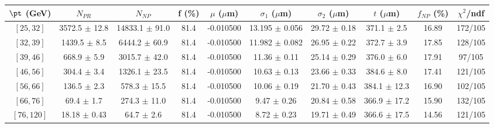 \begin{tabular}{c||c|c|c|c|c|c|c||c|c}
$\pt$ (GeV) & $N_{PR}$ & $N_{NP}$ & f (\%) & $\mu$ ($\mu$m) & $\sigma_1$ ($\mu$m) & $\sigma_2$ ($\mu$m)  & $t$ ($\mu$m) & $f_{NP}$ (\%) & $\chi^2$/ndf \\
\hline
$[25, 32]$ & 3572.5 $\pm$ 12.8 & 14833.1 $\pm$ 91.0 & 81.4 & -0.010500 & 13.195 $\pm$ 0.056 & 29.72 $\pm$ 0.18 & 371.1 $\pm$ 2.5 & 16.89 & 172/105\\
$[32, 39]$ & 1439.5 $\pm$ 8.5 & 6444.2 $\pm$ 60.9 & 81.4 & -0.010500 & 11.982 $\pm$ 0.082 & 26.95 $\pm$ 0.22 & 372.7 $\pm$ 3.9 & 17.85 & 128/105\\
$[39, 46]$ & 668.9 $\pm$ 5.9 & 3015.7 $\pm$ 42.0 & 81.4 & -0.010500 & 11.36 $\pm$ 0.11 & 25.14 $\pm$ 0.29 & 376.0 $\pm$ 6.0 & 17.91 & 97/105\\
$[46, 56]$ & 304.4 $\pm$ 3.4 & 1326.1 $\pm$ 23.5 & 81.4 & -0.010500 & 10.63 $\pm$ 0.13 & 23.66 $\pm$ 0.33 & 384.6 $\pm$ 8.0 & 17.41 & 121/105\\
$[56, 66]$ & 136.5 $\pm$ 2.3 & 578.3 $\pm$ 15.5 & 81.4 & -0.010500 & 10.06 $\pm$ 0.19 & 21.70 $\pm$ 0.43 & 384.1 $\pm$ 12.3 & 16.90 & 102/105\\
$[66, 76]$ & 69.4 $\pm$ 1.7 & 274.3 $\pm$ 11.0 & 81.4 & -0.010500 & 9.47 $\pm$ 0.26 & 20.84 $\pm$ 0.58 & 366.9 $\pm$ 17.2 & 15.90 & 132/105\\
$[76, 120]$ & 18.18 $\pm$ 0.43 & 64.7 $\pm$ 2.6 & 81.4 & -0.010500 & 8.72 $\pm$ 0.23 & 19.71 $\pm$ 0.49 & 366.6 $\pm$ 17.5 & 14.56 & 121/105\\
\end{tabular}
